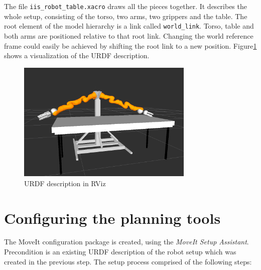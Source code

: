 The file \texttt{iis\_robot\_table.xacro} draws all the pieces together. It describes the whole setup, consisting of the torso, two arms, two grippers and the table. The root element of the model hierarchy is a link called \texttt{world\_link}. Torso, table and both arms are positioned relative to that root link. Changing the world reference frame could easily be achieved by shifting the root link to a new position. Figure\ref{fig:robot_table} shows a visualization of the URDF description.
\begin{figure}
	\centering
  	\includegraphics[width=0.75\textwidth]{images/iis_robot_table.png}
	\caption{URDF description in RViz}
	\label{fig:robot_table}
\end{figure}

\section{Configuring the planning tools}
\label{sec:moveit_assistant}

The MoveIt configuration package is created, using the \emph{MoveIt Setup Assistant}. Precondition is an existing URDF description of the robot setup which was created in the previous step.
The setup process comprised of the following steps:

